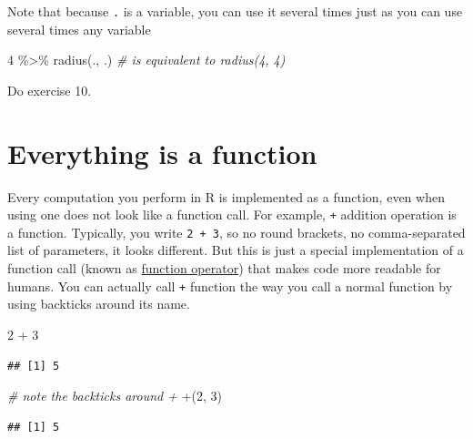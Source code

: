 \documentclass[
]{book}
\newenvironment{Shaded}{\begin{snugshade}}{\end{snugshade}}
\newcommand{\AttributeTok}[1]{\textcolor[rgb]{0.77,0.63,0.00}{#1}}
\newcommand{\CommentTok}[1]{\textcolor[rgb]{0.56,0.35,0.01}{\textit{#1}}}
\newcommand{\DecValTok}[1]{\textcolor[rgb]{0.00,0.00,0.81}{#1}}
\newcommand{\FunctionTok}[1]{\textcolor[rgb]{0.00,0.00,0.00}{#1}}
\newcommand{\NormalTok}[1]{#1}
\newcommand{\SpecialCharTok}[1]{\textcolor[rgb]{0.00,0.00,0.00}{#1}}
\newcommand{\StringTok}[1]{\textcolor[rgb]{0.31,0.60,0.02}{#1}}
\begin{document}
Note that because \texttt{.} is a variable, you can use it several times just as you can use several times any variable

\begin{Shaded}
\begin{Highlighting}[]
\DecValTok{4} \SpecialCharTok{\%\textgreater{}\%} \FunctionTok{radius}\NormalTok{(., .) }\CommentTok{\# is equivalent to radius(4, 4)}
\end{Highlighting}
\end{Shaded}

Do exercise 10.

\hypertarget{everything-is-a-function}{%
\section{Everything is a function}\label{everything-is-a-function}}

Every computation you perform in R is implemented as a function, even when using one does not look like a function call. For example, \texttt{+} addition operation is a function. Typically, you write \texttt{2\ +\ 3}, so no round brackets, no comma-separated list of parameters, it looks different. But this is just a special implementation of a function call (known as \href{http://adv-r.had.co.nz/Function-operators.html}{function operator}) that makes code more readable for humans. You can actually call \texttt{+} function the way you call a normal function by using backticks around its name.

\begin{Shaded}
\begin{Highlighting}[]
\DecValTok{2} \SpecialCharTok{+} \DecValTok{3}
\end{Highlighting}
\end{Shaded}

\begin{verbatim}
## [1] 5
\end{verbatim}

\begin{Shaded}
\begin{Highlighting}[]
\CommentTok{\# note the \textasciigrave{}backticks\textasciigrave{} around +}
\StringTok{\textasciigrave{}}\AttributeTok{+}\StringTok{\textasciigrave{}}\NormalTok{(}\DecValTok{2}\NormalTok{, }\DecValTok{3}\NormalTok{)}
\end{Highlighting}
\end{Shaded}

\begin{verbatim}
## [1] 5
\end{verbatim}
\end{document}
